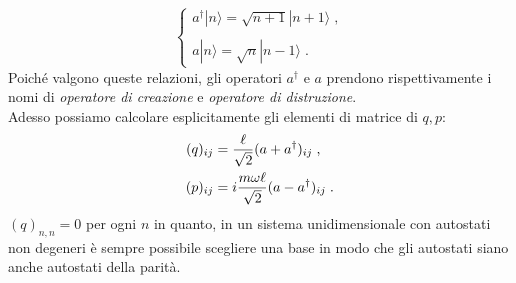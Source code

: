\documentclass[10pt,a4paper]{report}
\theoremstyle{definition}
\numberwithin{equation}{section}
\newcommand{\ket}{\rangle}
\newcommand{\adj}[1]{#1^{\dagger}}
\begin{document}
\begin{equation}
\begin{cases}
\adj{a}|n\ket=\sqrt{n+1}|n+1\ket\;, \\
\\
a|n\ket=\sqrt{n}|n-1\ket\;.
\end{cases}
\end{equation}
Poiché valgono queste relazioni, gli operatori $\adj{a}$ e $a$ prendono rispettivamente i nomi di \textit{operatore di creazione} e \textit{operatore di distruzione}. \\
Adesso possiamo calcolare esplicitamente gli elementi di matrice di $q,p$:
\begin{align}
(q)_{ij}&=\frac{\ell}{\sqrt{2}}(a+\adj{a})_{ij}\;, \notag \\
(p)_{ij} &= i\frac{m\omega\ell}{\sqrt{2}}(a-\adj{a})_{ij}\;.
\end{align}
$(q)_{n,n}=0$ per ogni $n$ in quanto, in un sistema unidimensionale con autostati non degeneri è sempre possibile scegliere una base in modo che gli autostati siano anche autostati della parità.
\end{document}
